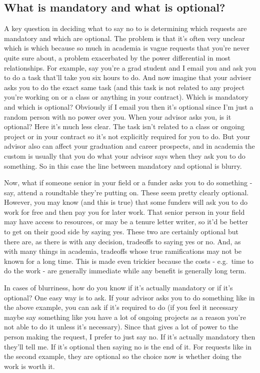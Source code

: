 \documentclass[
  12pt,
]{book}
\begin{document}
\hypertarget{what-is-mandatory-and-what-is-optional}{%
\subsection{What is mandatory and what is optional?}\label{what-is-mandatory-and-what-is-optional}}

A key question in deciding what to say no to is determining which requests are mandatory and which are optional. The problem is that it's often very unclear which is which because so much in academia is vague requests that you're never quite sure about, a problem exacerbated by the power differential in most relationships. For example, say you're a grad student and I email you and ask you to do a task that'll take you six hours to do. And now imagine that your adviser asks you to do the exact same task (and this task is not related to any project you're working on or a class or anything in your contract). Which is mandatory and which is optional? Obviously if I email you then it's optional since I'm just a random person with no power over you. When your advisor asks you, is it optional? Here it's much less clear. The task isn't related to a class or ongoing project or in your contract so it's not explicitly required for you to do. But your advisor also can affect your graduation and career prospects, and in academia the custom is usually that you do what your advisor says when they ask you to do something. So in this case the line between mandatory and optional is blurry.

Now, what if someone senior in your field or a funder asks you to do something - say, attend a roundtable they're putting on. These seem pretty clearly optional. However, you may know (and this is true) that some funders will ask you to do work for free and then pay you for later work. That senior person in your field may have access to resources, or may be a tenure letter writer, so it'd be better to get on their good side by saying yes. These two are certainly optional but there are, as there is with any decision, tradeoffs to saying yes or no. And, as with many things in academia, tradeoffs whose true ramifications may not be known for a long time. This is made even trickier because the costs - e.g.~time to do the work - are generally immediate while any benefit is generally long term.

In cases of blurriness, how do you know if it's actually mandatory or if it's optional? One easy way is to ask. If your advisor asks you to do something like in the above example, you can ask if it's required to do (if you feel it necessary maybe say something like you have a lot of ongoing projects as a reason you're not able to do it unless it's necessary). Since that gives a lot of power to the person making the request, I prefer to just say no. If it's actually mandatory then they'll tell me. If it's optional then saying no is the end of it. For requests like in the second example, they are optional so the choice now is whether doing the work is worth it.
\end{document}
